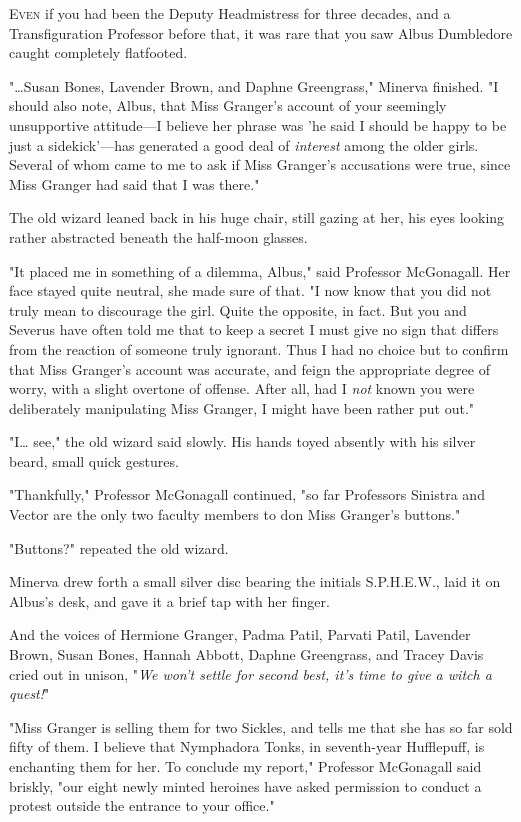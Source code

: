 
\lettrine{E}{ven} if you had 
been the Deputy Headmistress for three decades, and a Transfiguration Professor 
before that, it was rare that you saw Albus Dumbledore caught completely 
flatfooted.

"{\ldots}Susan Bones, Lavender Brown, and Daphne Greengrass," Minerva finished. 
"I should also note, Albus, that Miss Granger's account of your seemingly 
unsupportive attitude---I believe her phrase was 'he said I should be happy to 
be just a sidekick'---has generated a good deal of \emph{interest} among the 
older girls. Several of whom came to me to ask if Miss Granger's accusations 
were true, since Miss Granger had said that I was there."

The old wizard leaned back in his huge chair, still gazing at her, his eyes 
looking rather abstracted beneath the half-moon glasses.

"It placed me in something of a dilemma, Albus," said Professor McGonagall. Her 
face stayed quite neutral, she made sure of that. "I now know that you did not 
truly mean to discourage the girl. Quite the opposite, in fact. But you and 
Severus have often told me that to keep a secret I must give no sign that 
differs from the reaction of someone truly ignorant. Thus I had no choice but 
to confirm that Miss Granger's account was accurate, and feign the appropriate 
degree of worry, with a slight overtone of offense. After all, had I \emph{not} 
known you were deliberately manipulating Miss Granger, I might have been rather 
put out."

"I{\ldots} see," the old wizard said slowly. His hands toyed absently with his 
silver beard, small quick gestures.

"Thankfully," Professor McGonagall continued, "so far Professors Sinistra and 
Vector are the only two faculty members to don Miss Granger's buttons."

"Buttons?" repeated the old wizard.

Minerva drew forth a small silver disc bearing the initials S.P.H.E.W., laid it 
on Albus's desk, and gave it a brief tap with her finger.

And the voices of Hermione Granger, Padma Patil, Parvati Patil, Lavender Brown, 
Susan Bones, Hannah Abbott, Daphne Greengrass, and Tracey Davis cried out in 
unison, "\emph{We won't settle for second best, it's time to give a witch a 
quest!}"

"Miss Granger is selling them for two Sickles, and tells me that she has so far 
sold fifty of them. I believe that Nymphadora Tonks, in seventh-year 
Hufflepuff, is enchanting them for her. To conclude my report," Professor 
McGonagall said briskly, "our eight newly minted heroines have asked permission 
to conduct a protest outside the entrance to your office."

